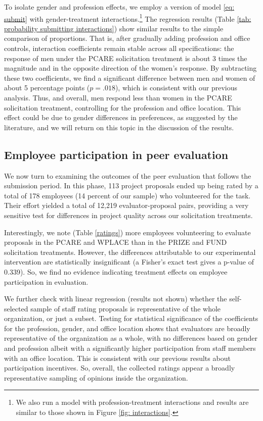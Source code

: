 \documentclass[11pt, titlepage]{article}
\begin{document}


To isolate gender and profession effects, we employ a version of model
\eqref{eq: submit} with gender-treatment interactions.\footnote{We also
  run a model with profession-treatment interactions and results are
  similar to those shown in Figure \ref{fig: interactions}.} The
regression results (Table
\ref{tab: probability submitting interactions}) show similar results to
the simple comparison of proportions. That is, after gradually adding
profession and office controls, interaction coefficients remain stable
across all specifications: the response of men under the PCARE
solicitation treatment is about 3 times the magnitude and in the
opposite direction of the women's response. By subtracting these two
coefficients, we find a significant difference between men and women of
about 5 percentage points (\(p=.018\)), which is consistent with our
previous analysis. Thus, and overall, men respond less than women in the
PCARE solicitation treatment, controlling for the profession and office
location. This effect could be due to gender differences in preferences,
as suggested by the literature, and we will return on this topic in the
discussion of the results.

\subsection{Employee participation in peer
evaluation}\label{employee-participation-in-peer-evaluation}

We now turn to examining the outcomes of the peer evaluation that
follows the submission period. In this phase, 113 project proposals
ended up being rated by a total of 178 employees (14 percent of our
sample) who volunteered for the task. Their effort yielded a total of
12,219 evaluator-proposal pairs, providing a very sensitive test for
differences in project quality across our solicitation treatments.



Interestingly, we note (Table \ref{ratings}) more employees volunteering
to evaluate proposals in the PCARE and WPLACE than in the PRIZE and FUND
solicitation treatments. However, the differences attributable to our
experimental intervention are statistically insignificant (a Fisher's
exact test gives a p-value of 0.339). So, we find no evidence indicating
treatment effects on employee participation in evaluation.

We further check with linear regression (results not shown) whether the
self-selected sample of staff rating proposals is representative of the
whole organization, or just a subset. Testing for statistical
significance of the coefficients for the profession, gender, and office
location shows that evaluators are broadly representative of the
organization as a whole, with no differences based on gender and
profession albeit with a significantly higher participation from staff
members with an office location. This is consistent with our previous
results about participation incentives. So, overall, the collected
ratings appear a broadly representative sampling of opinions inside the
organization.
\end{document}

